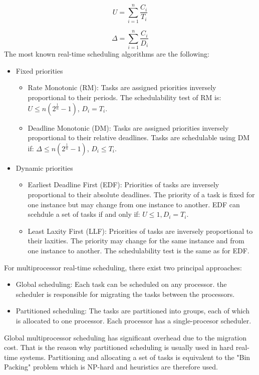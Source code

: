 \begin{equation}
U = \sum_{i=1}^{n}\frac{C_i}{T_i}
\end{equation}

\begin{equation}
\Delta = \sum_{i=1}^{n}\frac{C_i}{D_i}
\end{equation}
The most known real-time scheduling algorithms are the following:

\begin{itemize}
\item Fixed priorities
\begin{itemize}
\item Rate Monotonic (RM): Tasks are assigned priorities inversely proportional to their periods. The schedulability test of RM is: $U \leq n(2^{\frac{1}{n}}-1)$, $D_i = T_i$. 
\item Deadline Monotonic (DM): Tasks are assigned priorities inversely proportional to their relative deadlines. Tasks are schedulable using DM if: $\Delta \leq n(2^{\frac{1}{n}}-1)$, $D_i \leq T_i$. 
\end{itemize}
\item Dynamic priorities
\begin{itemize}
\item Earliest Deadline First (EDF): Priorities of tasks are inversely proportional to their absolute deadlines. The priority of a task is fixed for one instance but may change from one instance to another. EDF can scehdule a set of tasks if and only if: $U \leq 1, D_i = T_i$.
\item Least Laxity First (LLF): Priorities of tasks are inversely proportional to their laxities. The priority may change for the same instance and from one instance to another. The schedulability test is the same as for EDF.
\end{itemize}
\end{itemize}
 For multiprocessor real-time scheduling, there exist two principal approaches:

\begin{itemize}
\item Global scheduling: Each task can be scheduled on any processor. the scheduler is responsible for migrating the tasks between the processors.
\item Partitioned scheduling: The tasks are partitioned into groups, each of which is allocated to one processor. Each processor has a single-procesor scheduler. 
\end{itemize}
Global multiprocessor scheduling has significant overhead due to the migration cost. That is the reason why partitioned scheduling is usually used in hard real-time systems. Partitioning and allocating a set of tasks is equivalent to the "Bin Packing" problem which is NP-hard and heuristics are therefore used. 

